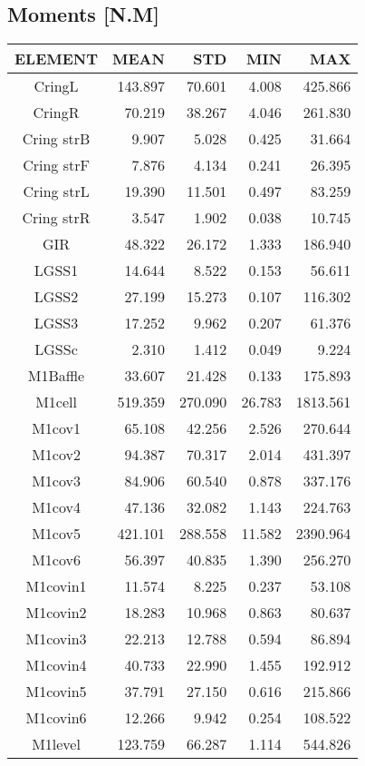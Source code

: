 \subsection{Moments [N.M]}
\begin{longtable}{crrrr}\toprule
 ELEMENT & MEAN & STD & MIN & MAX \\\hline
 CringL & 143.897 & 70.601 & 4.008 & 425.866 \\
 CringR & 70.219 & 38.267 & 4.046 & 261.830 \\
 Cring strB & 9.907 & 5.028 & 0.425 & 31.664 \\
 Cring strF & 7.876 & 4.134 & 0.241 & 26.395 \\
 Cring strL & 19.390 & 11.501 & 0.497 & 83.259 \\
 Cring strR & 3.547 & 1.902 & 0.038 & 10.745 \\
 GIR & 48.322 & 26.172 & 1.333 & 186.940 \\
 LGSS1 & 14.644 & 8.522 & 0.153 & 56.611 \\
 LGSS2 & 27.199 & 15.273 & 0.107 & 116.302 \\
 LGSS3 & 17.252 & 9.962 & 0.207 & 61.376 \\
 LGSSc & 2.310 & 1.412 & 0.049 & 9.224 \\
 M1Baffle & 33.607 & 21.428 & 0.133 & 175.893 \\
 M1cell & 519.359 & 270.090 & 26.783 & 1813.561 \\
 M1cov1 & 65.108 & 42.256 & 2.526 & 270.644 \\
 M1cov2 & 94.387 & 70.317 & 2.014 & 431.397 \\
 M1cov3 & 84.906 & 60.540 & 0.878 & 337.176 \\
 M1cov4 & 47.136 & 32.082 & 1.143 & 224.763 \\
 M1cov5 & 421.101 & 288.558 & 11.582 & 2390.964 \\
 M1cov6 & 56.397 & 40.835 & 1.390 & 256.270 \\
 M1covin1 & 11.574 & 8.225 & 0.237 & 53.108 \\
 M1covin2 & 18.283 & 10.968 & 0.863 & 80.637 \\
 M1covin3 & 22.213 & 12.788 & 0.594 & 86.894 \\
 M1covin4 & 40.733 & 22.990 & 1.455 & 192.912 \\
 M1covin5 & 37.791 & 27.150 & 0.616 & 215.866 \\
 M1covin6 & 12.266 & 9.942 & 0.254 & 108.522 \\
 M1level & 123.759 & 66.287 & 1.114 & 544.826 \\

\end{longtable}
